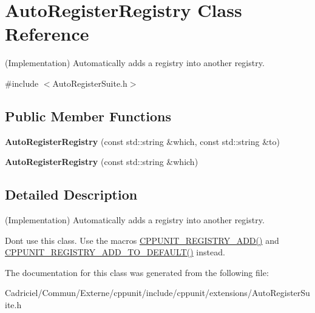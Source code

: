 \hypertarget{class_auto_register_registry}{}\section{Auto\+Register\+Registry Class Reference}
\label{class_auto_register_registry}


(Implementation) Automatically adds a registry into another registry.  




{\ttfamily \#include $<$Auto\+Register\+Suite.\+h$>$}

\subsection*{Public Member Functions}
\begin{DoxyCompactItemize}
\item 
{\bfseries Auto\+Register\+Registry} (const std\+::string \&which, const std\+::string \&to)\hypertarget{class_auto_register_registry_aeb3c0171549420bc18714d4117d9c2b5}{}\label{class_auto_register_registry_aeb3c0171549420bc18714d4117d9c2b5}

\item 
{\bfseries Auto\+Register\+Registry} (const std\+::string \&which)\hypertarget{class_auto_register_registry_a3efb50c6218f5d0e5969eb6fc8bccb23}{}\label{class_auto_register_registry_a3efb50c6218f5d0e5969eb6fc8bccb23}

\end{DoxyCompactItemize}


\subsection{Detailed Description}
(Implementation) Automatically adds a registry into another registry. 

Don\textquotesingle{}t use this class. Use the macros \hyperlink{_helper_macros_8h_a0ca9e37aca06e802300f2572b974e2bb}{C\+P\+P\+U\+N\+I\+T\+\_\+\+R\+E\+G\+I\+S\+T\+R\+Y\+\_\+\+A\+D\+D()} and \hyperlink{_helper_macros_8h_a1dde8c3db38012da58e1e456b7e4e346}{C\+P\+P\+U\+N\+I\+T\+\_\+\+R\+E\+G\+I\+S\+T\+R\+Y\+\_\+\+A\+D\+D\+\_\+\+T\+O\+\_\+\+D\+E\+F\+A\+U\+L\+T()} instead. 

The documentation for this class was generated from the following file\+:\begin{DoxyCompactItemize}
\item 
Cadriciel/\+Commun/\+Externe/cppunit/include/cppunit/extensions/Auto\+Register\+Suite.\+h\end{DoxyCompactItemize}
